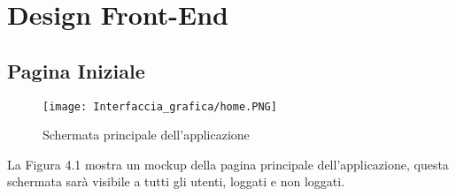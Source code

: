 \chapter{Design Front-End}
\thispagestyle{stdPage}


\section{Pagina Iniziale}

    \label{fig:4.1}
    \begin{figure}[H]
        \center
        \texttt{[image: Interfaccia\_grafica/home.PNG]}
        \caption{Schermata principale dell'applicazione}
    \end{figure}

    La Figura 4.1 mostra un mockup della pagina principale dell'applicazione, questa schermata sarà visibile a tutti gli utenti, loggati e non loggati.

